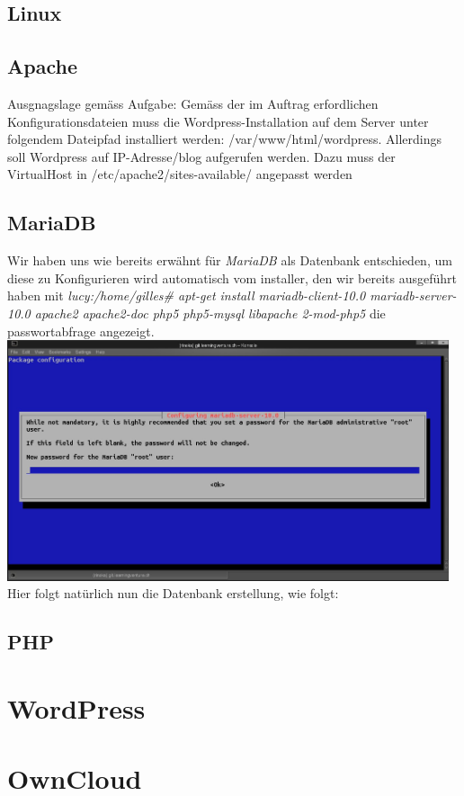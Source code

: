 \documentclass{article}
\begin{document}
	\subsection{Linux}
	\subsection{Apache}
	Ausgnagslage gemäss Aufgabe:
	\newline
	Gemäss der im Auftrag erfordlichen Konfigurationsdateien muss die Wordpress-Installation auf dem Server unter folgendem Dateipfad installiert werden: /var/www/html/wordpress.
	\linebreak 
	\noindent\hspace*{5mm} Allerdings soll Wordpress auf IP-Adresse/blog aufgerufen werden. Dazu muss der VirtualHost in /etc/apache2/sites-available/ angepasst werden
	\subsection{MariaDB}
	Wir haben uns wie bereits erwähnt für \textit{MariaDB}  als Datenbank entschieden, um diese zu Konfigurieren wird automatisch vom installer, den wir bereits ausgeführt haben mit \textit{lucy:/home/gilles\# apt-get install mariadb-client-10.0 mariadb-server-10.0 apache2 apache2-doc php5 php5-mysql libapache 2-mod-php5} die passwortabfrage angezeigt.
	\newline
	\newline
	\includegraphics[width=13cm]{../Pics/3-lamp-stack-mariadb}
	\newline
	\newline
	Hier folgt natürlich nun die Datenbank erstellung, wie folgt:
	\subsection{PHP}
	\section{WordPress}
	\section{OwnCloud}
\end{document}
